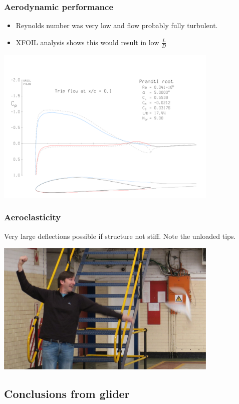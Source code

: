 \documentclass{beamer}
\begin{document}
\begin{frame}
\frametitle{Aerodynamic performance}

\begin{itemize}
\item Reynolds number was very low and flow probably fully turbulent.
\item XFOIL analysis shows this would result in low $\frac{L}{D}$
\end{itemize}


\includegraphics[width = 0.8\textwidth]{Pictures/PrandtlRoot5alhpa.png}

\end{frame}






\begin{frame}
\frametitle{Aeroelasticity}

Very large deflections possible if structure not stiff.  Note the unloaded tips.

\includegraphics[width = 0.8\textwidth]{Pictures/MassiveDeflect.JPG}

\end{frame}

\subsection{Conclusions from glider}
\end{document}
